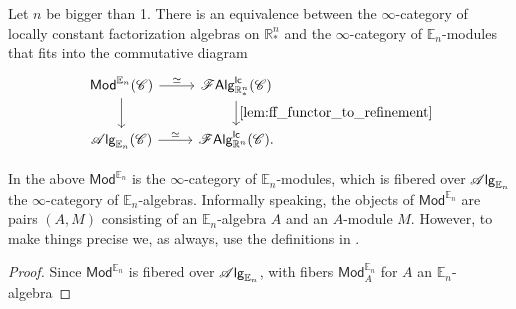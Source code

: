 \documentclass[../text]{subfiles}
\begin{document}
\begin{theorem}
    Let $n$ be bigger than 1. There is an equivalence between the $\infty$-category of locally constant factorization algebras on $\mathbb{R}^n_*$ and the $\infty$-category of $\mathbb{E}_n$-modules that fits into the commutative diagram
    \begin{equation}
        \begin{tikzcd}
            \mathsf{Mod}^{\mathbb{E}_n} (\catC) \arrow[r, "\simeq"] \arrow[d] & \lcfa_{\mathbb{R}^n_*} (\catC) \arrow[d, "\cref{lem:ff_functor_to_refinement}"] \\
            \alg{\mathbb{E}_n} (\catC) \arrow[r, "\simeq"] & \lcfa_{\mathbb{R}^n} (\catC).
        \end{tikzcd}
    \end{equation}
\end{theorem}

\begin{remark}
    In the above $\mathsf{Mod}^{\mathbb{E}_n}$ is the $\infty$-category of $\mathbb{E}_n$-modules, which is fibered over $\mathscr{A} \mathsf{lg}_{\mathbb{E}_n}$ the $\infty$-category of $\mathbb{E}_n$-algebras. Informally speaking, the objects of $\mathsf{Mod}^{\mathbb{E}_n}$ are pairs $(A, M)$ consisting of an $\mathbb{E}_n$-algebra $A$ and an $A$-module $M$. However, to make things precise we, as always, use the definitions in \cite[ch.3]{lurie_ha}.
\end{remark}


\begin{proof}
    Since $\mathsf{Mod}^{\mathbb{E}_n}$ is fibered over $\mathscr{A} \mathsf{lg}_{\mathbb{E}_n}$, with fibers $\mathsf{Mod}^{\mathbb{E}_n}_A$ for $A$ an $\mathbb{E}_n$-algebra
\end{proof}


\end{document}
